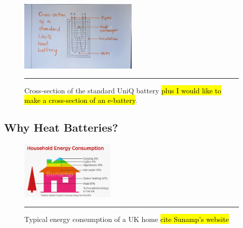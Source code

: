 \begin{figure}[htbp]
	\centering
	\includegraphics[width=0.5\textwidth]{figures/UniQ_cross-section_draft.jpeg}
	\rule{0.5\textwidth}{0.5pt} %
	\caption{Cross-section of the standard UniQ battery \hl{plus I would like to make a cross-section of an e-battery}.}
	\label{fig:cross-section-draft}
\end{figure}



\newpage
\subsection*{Why Heat Batteries?}

\begin{figure}
	\includegraphics[width=0.4\textwidth]{figures/household-energy-consumption.jpg}
	\rule{0.4\textwidth}{0.5pt} %
	\caption{Typical energy consumption of a UK home \hl{cite Sunamp's website}
	}
	\label{fig:domestic-energy}
\end{figure}

